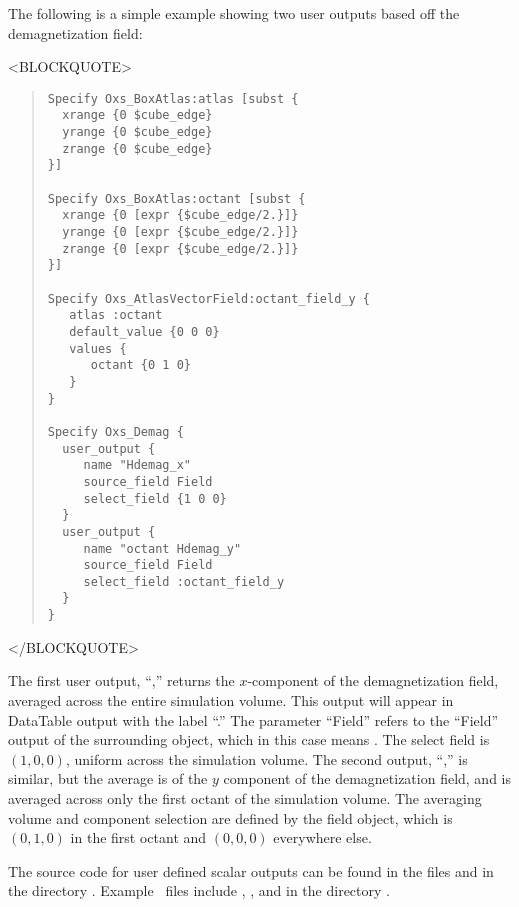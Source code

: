 The following is a simple example showing two user outputs based
off the demagnetization field:
\begin{rawhtml}<BLOCKQUOTE>\end{rawhtml}
\begin{quote}
\begin{verbatim}
Specify Oxs_BoxAtlas:atlas [subst {
  xrange {0 $cube_edge}
  yrange {0 $cube_edge}
  zrange {0 $cube_edge}
}]

Specify Oxs_BoxAtlas:octant [subst {
  xrange {0 [expr {$cube_edge/2.}]}
  yrange {0 [expr {$cube_edge/2.}]}
  zrange {0 [expr {$cube_edge/2.}]}
}]

Specify Oxs_AtlasVectorField:octant_field_y {
   atlas :octant
   default_value {0 0 0}
   values {
      octant {0 1 0}
   }
}

Specify Oxs_Demag {
  user_output {
     name "Hdemag_x"
     source_field Field
     select_field {1 0 0}
  }
  user_output {
     name "octant Hdemag_y"
     source_field Field
     select_field :octant_field_y
  }
}
\end{verbatim}
\end{quote}
\begin{rawhtml}</BLOCKQUOTE>\end{rawhtml}
The first user output, ``,'' returns the
$x$-component of the demagnetization field, averaged across the entire
simulation volume.  This output will appear in DataTable output with the
label ``.''  The  parameter
``Field'' refers to the ``Field'' output of the surrounding
 object, which in this case means .
The select field is $(1,0,0)$, uniform across the simulation volume.
The second output, ``,'' is similar, but the
average is of the $y$ component of the demagnetization field, and is
averaged across only the first octant of the simulation volume.  The
averaging volume and component selection are defined by the
 field object, which is $(0,1,0)$ in the first
octant and $(0,0,0)$ everywhere else.

The source code for user defined scalar outputs can be found in the
files  and  in the directory
.  Example \MIF\ files include ,
, and  in the directory
.

